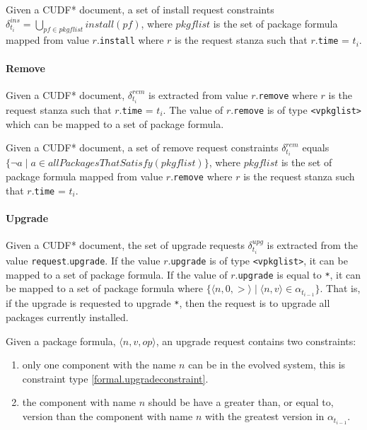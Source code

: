 \begin{defs}
Given a CUDF* document, a set of install request constraints $\delta_{t_i}^{ins} = \bigcup \limits_{pf \in pkgflist} install(pf)$, 
where $pkgflist$ is the set of package formula mapped from value $r$.\texttt{install} where $r$ is the request stanza such that $r$.\texttt{time} = $t_i$.
\end{defs}

\paragraph{Remove}
Given a CUDF* document, $\delta_{t_i}^{rem}$ is extracted from value $r$.\texttt{remove} where $r$ is the request stanza such that $r$.\texttt{time} = $t_i$.
The value of $r$.\texttt{remove} is of type \texttt{<vpkglist>} which can be mapped to a set of package formula.
\begin{defs}
Given a CUDF* document, a set of remove request constraints $\delta_{t_i}^{rem}$ equals $\{ \neg a \mid a \in allPackagesThatSatisfy(pkgflist)\}$, 
where $pkgflist$ is the set of package formula mapped from value $r$.\texttt{remove} where $r$ is the request stanza such that $r$.\texttt{time} = $t_i$.
\end{defs}

\paragraph{Upgrade}
Given a CUDF* document, the set of upgrade requests $\delta_{t_i}^{upg}$ is extracted from the value \texttt{request}.\texttt{upgrade}.
If the value $r$.\texttt{upgrade} is of type \texttt{<vpkglist>}, it can be mapped to a set of package formula.
If the value of $r$.\texttt{upgrade} is equal to \texttt{*}, it can be mapped to a set of package formula where $\{\langle n, 0, > \rangle \mid \langle n,v \rangle \in \alpha_{t_{i-1}} \}$.
That is, if the upgrade is requested to upgrade \texttt{*}, then the request is to upgrade all packages currently installed.

Given a package formula, $\langle n, v, op \rangle$, an upgrade request contains two constraints:
\begin{enumerate}
  \item only one component with the name $n$ can be in the evolved system, this is constraint type \ref{formal.upgradeconstraint}.
  \item the component with name $n$ should be have a greater than, or equal to, version than the component with name $n$ with the greatest version in $\alpha_{t_{i-1}}$.
\end{enumerate}

